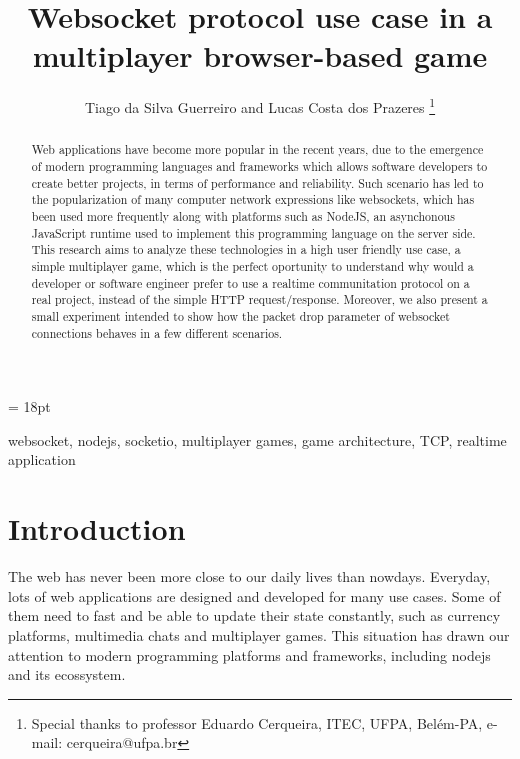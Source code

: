 \documentclass[english]{sbrt}
\begin{document}
\title{Websocket protocol use case in a multiplayer browser-based game}

\author{Tiago da Silva Guerreiro and Lucas Costa dos Prazeres
  \thanks{Special thanks to professor Eduardo Cerqueira, ITEC, UFPA, Belém-PA, e-mail: cerqueira@ufpa.br}
}

\maketitle

\baselineskip = 18pt


\begin{abstract}
  Web applications have become more popular in the recent years, due to the emergence of modern programming languages and frameworks which allows software developers to create better projects, in terms of performance and reliability.
Such scenario has led to the popularization of many computer network expressions like websockets, which has been used more frequently along with platforms such as NodeJS, an asynchonous JavaScript runtime used to implement this programming language
on the server side. This research aims to analyze these technologies in a high user friendly use case, a simple multiplayer game, which is the perfect oportunity to understand why would a developer or software engineer prefer to use a realtime communitation
protocol on a real project, instead of the simple HTTP request/response. Moreover, we also present a small experiment intended to show how the packet drop parameter of websocket connections behaves in a few different scenarios.

\end{abstract}
\begin{keywords}
  websocket, nodejs, socketio, multiplayer games, game architecture, TCP, realtime application
\end{keywords}

\section{\textbf{Introduction}}

The web has never been more close to our daily lives than nowdays. Everyday, lots of web applications are designed and developed for
many use cases. Some of them need to fast and be able to update their state constantly, such as currency platforms, multimedia chats and multiplayer games.
This situation has drawn our attention to modern programming platforms and frameworks, including nodejs and its ecossystem.
\end{document}
